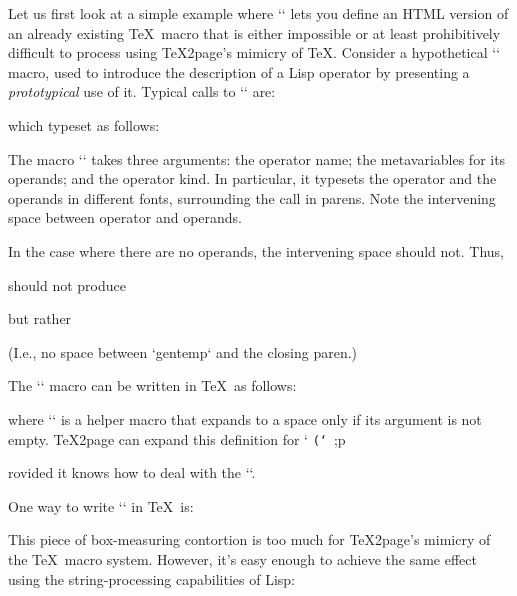 {{{{{{{{{Let us first look at a simple example where
`\eval` lets you define an HTML version of an already
existing \TeX\ macro that is either impossible or at
least prohibitively difficult  to process using
\TeX2page’s  mimicry of \TeX.  Consider a hypothetical
`\proto` macro, used to introduce the description of
a Lisp operator by presenting a {\em prototypical}
use of it.
Typical calls to `\proto` are:

\begintt
{}
\endtt
%
which typeset as follows:

\quote
{}
\endquote
The macro `\proto` takes three arguments: the
operator name; the metavariables for its operands;
and the operator kind.  In particular, it typesets
the operator and the operands in different fonts,
surrounding the call in parens.  Note the
intervening space between operator and operands.

In the case where there are no operands, the intervening
space should not.  Thus,

\begintt
{}
\endtt
%
should not produce

\quote
{}
\endquote
but rather

\quote
{}
\endquote
(I.e., no space between `gentemp` and the
closing paren.)


The `\proto` macro can be written
in \TeX\ as follows:

\begintt
\def\proto#1#2#3{\noindent
  \hbox{{\tt(#1}\spaceifnotempty{#2}{\it#2}{\tt)}%
    \qquad ;#3}\par}
\endtt
%
where `\spaceifnotempty` is a helper macro
that expands to a space only if its argument is
not empty.  \TeX2page can expand this definition
for `\proto`, provided it knows how to deal
with the `\spaceifnotempty`.

One way to write `\spaceifnotempty` in \TeX\
is:

\begintt
\newdimen\templen
\newbox\tempbox

\def\spaceifnotempty#1{%
  \setbox\tempbox\hbox{#1}%
  \templen\wd\tempbox
  \ifdim\templen>0pt{\ }\fi}
\endtt
%
This piece of box-measuring contortion is
too much for \TeX2page’s mimicry of the \TeX\ macro
system.  However, it’s easy enough to  achieve the
same effect using the string-processing capabilities
of Lisp:

}}}}}}}}}
